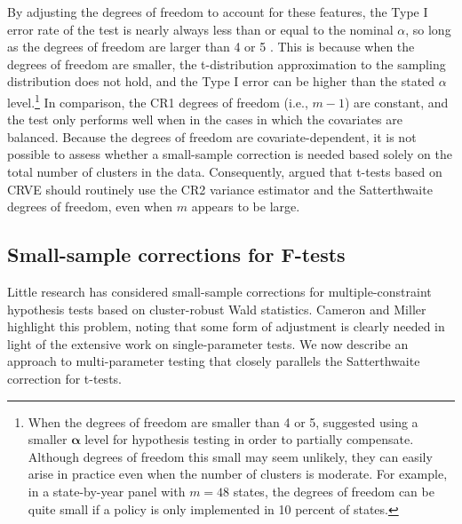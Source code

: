 \documentclass[draft]{ectaart}\usepackage[]{graphicx}\usepackage[]{color}
\newcommand{\bs}{\boldsymbol}
\begin{document}
By adjusting the degrees of freedom to account for these features, the Type I error rate of the test is nearly always less than or equal to the nominal $\alpha$, so long as the degrees of freedom are larger than 4 or 5 \citep{Bell2002bias, Tipton2015small-t}.
This is because when the degrees of freedom are smaller, the t-distribution approximation to the sampling distribution does not hold, and the Type I error can be higher than the stated $\alpha$ level.\footnote{When the degrees of freedom are smaller than 4 or 5, \citet{Tipton2015small-t} suggested using a smaller $\bs\alpha$ level for hypothesis testing in order to partially compensate. 
Although degrees of freedom this small may seem unlikely, they can easily arise in practice even when the number of clusters is moderate. For example, in a state-by-year panel with $m = 48$ states, the degrees of freedom can be quite small if a policy is only implemented in 10 percent of states.}
In comparison, the CR1 degrees of freedom (i.e., $m - 1$) are constant, and the test only performs well when in the cases in which the covariates are balanced.
Because the degrees of freedom are covariate-dependent, it is not possible to assess whether a small-sample correction is needed based solely on the total number of clusters in the data. 
Consequently, \citet{Tipton2015small-t} argued that t-tests based on CRVE should routinely use the CR2 variance estimator and the Satterthwaite degrees of freedom, even when $m$ appears to be large.


\subsection{Small-sample corrections for F-tests}
\label{subsec:F-tests}

Little research has considered small-sample corrections for multiple-constraint hypothesis tests based on cluster-robust Wald statistics.
Cameron and Miller highlight this problem, noting that some form of adjustment is clearly needed in light of the extensive work on single-parameter tests.
We now describe an approach to multi-parameter testing that closely parallels the Satterthwaite correction for t-tests.
\end{document}
